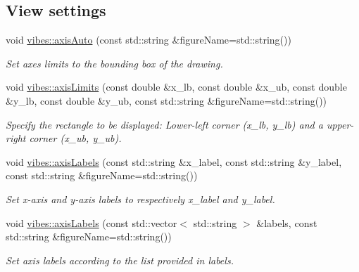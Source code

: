 \subsection*{View settings}
\begin{DoxyCompactItemize}
\item 
\mbox{\label{group__figure_ga5f783122c88718659b7e8697235e1b1a}} 
void \hyperlink{group__figure_ga5f783122c88718659b7e8697235e1b1a}{vibes\+::axis\+Auto} (const std\+::string \&figure\+Name=std\+::string())
\begin{DoxyCompactList}\small\item\em Set axes limits to the bounding box of the drawing. \end{DoxyCompactList}\item 
\mbox{\label{group__figure_ga60332429e40faee0da4e3a5a6b71b6b1}} 
void \hyperlink{group__figure_ga60332429e40faee0da4e3a5a6b71b6b1}{vibes\+::axis\+Limits} (const double \&x\+\_\+lb, const double \&x\+\_\+ub, const double \&y\+\_\+lb, const double \&y\+\_\+ub, const std\+::string \&figure\+Name=std\+::string())
\begin{DoxyCompactList}\small\item\em Specify the rectangle to be displayed\+: Lower-\/left corner ({\itshape x\+\_\+lb}, {\itshape y\+\_\+lb}) and a upper-\/right corner ({\itshape x\+\_\+ub}, {\itshape y\+\_\+ub}). \end{DoxyCompactList}\item 
\mbox{\label{group__figure_ga1a9931de0e9f8195d66547a22f57aaa1}} 
void \hyperlink{group__figure_ga1a9931de0e9f8195d66547a22f57aaa1}{vibes\+::axis\+Labels} (const std\+::string \&x\+\_\+label, const std\+::string \&y\+\_\+label, const std\+::string \&figure\+Name=std\+::string())
\begin{DoxyCompactList}\small\item\em Set x-\/axis and y-\/axis labels to respectively {\itshape x\+\_\+label} and {\itshape y\+\_\+label}. \end{DoxyCompactList}\item 
\mbox{\label{group__figure_gaecbcdf234c90fa4065e7650ae1e518f0}} 
void \hyperlink{group__figure_gaecbcdf234c90fa4065e7650ae1e518f0}{vibes\+::axis\+Labels} (const std\+::vector$<$ std\+::string $>$ \&labels, const std\+::string \&figure\+Name=std\+::string())
\begin{DoxyCompactList}\small\item\em Set axis labels according to the list provided in {\itshape labels}. \end{DoxyCompactList}\end{DoxyCompactItemize}
